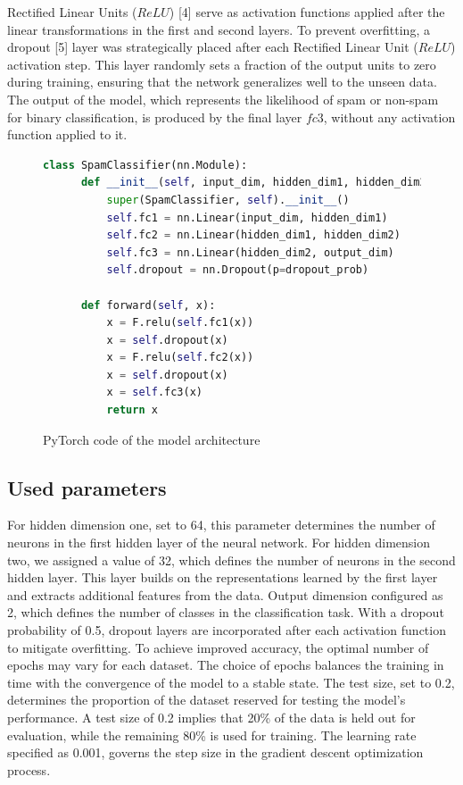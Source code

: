 \indent Rectified Linear Units ($ReLU$) [4] serve as activation functions applied after the linear transformations in the first and second layers.
To prevent overfitting, a dropout [5] layer was strategically placed after each Rectified Linear Unit ($ReLU$) activation step.
This layer randomly sets a fraction of the output units to zero during training, ensuring that the network generalizes well to the unseen data. \\

\indent The output of the model, which represents the likelihood of spam or non-spam for binary classification, is produced by the final layer $fc3$, without any activation function applied to it.

\begin{figure}[htp]
  \begin{lstlisting}[language=Python, label=modell]
    class SpamClassifier(nn.Module):
      def __init__(self, input_dim, hidden_dim1, hidden_dim2, output_dim, dropout_prob):
          super(SpamClassifier, self).__init__()
          self.fc1 = nn.Linear(input_dim, hidden_dim1)
          self.fc2 = nn.Linear(hidden_dim1, hidden_dim2)
          self.fc3 = nn.Linear(hidden_dim2, output_dim)
          self.dropout = nn.Dropout(p=dropout_prob)

      def forward(self, x):
          x = F.relu(self.fc1(x))
          x = self.dropout(x)
          x = F.relu(self.fc2(x))
          x = self.dropout(x)
          x = self.fc3(x)
          return x
  \end{lstlisting}
  \caption{PyTorch code of the model architecture}
\end{figure}

\subsection{Used parameters}
\indent For hidden dimension one, set to 64, this parameter determines the number of neurons in the first hidden layer of the neural network.
For hidden dimension two, we assigned a value of 32, which defines the number of neurons in the second hidden layer.
This layer builds on the representations learned by the first layer and extracts additional features from the data.
Output dimension configured as 2, which defines the number of classes in the classification task.
With a dropout probability of 0.5, dropout layers are incorporated after each activation function to mitigate overfitting.
To achieve improved accuracy, the optimal number of epochs may vary for each dataset.
The choice of epochs balances the training in time with the convergence of the model to a stable state.
The test size, set to 0.2, determines the proportion of the dataset reserved for testing the model's performance. A test size of 0.2 implies that 20\% of the data is held out for evaluation, while the remaining 80\% is used for training.
The learning rate specified as 0.001, governs the step size in the gradient descent optimization process.

